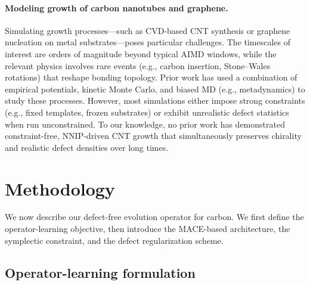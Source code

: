 \documentclass{article}
\begin{document}
\paragraph{Modeling growth of carbon nanotubes and graphene.}
Simulating growth processes---such as CVD-based CNT synthesis or graphene nucleation on metal substrates---poses particular challenges. The timescales of interest are orders of magnitude beyond typical AIMD windows, while the relevant physics involves rare events (e.g., carbon insertion, Stone--Wales rotations) that reshape bonding topology. Prior work has used a combination of empirical potentials, kinetic Monte Carlo, and biased MD (e.g., metadynamics) to study these processes. However, most simulations either impose strong constraints (e.g., fixed templates, frozen substrates) or exhibit unrealistic defect statistics when run unconstrained. To our knowledge, no prior work has demonstrated constraint-free, NNIP-driven CNT growth that simultaneously preserves chirality and realistic defect densities over long times.

\section{Methodology}
\label{sec:method}

We now describe our defect-free evolution operator for carbon. We first define the operator-learning objective, then introduce the MACE-based architecture, the symplectic constraint, and the defect regularization scheme.

\subsection{Operator-learning formulation}
\end{document}
